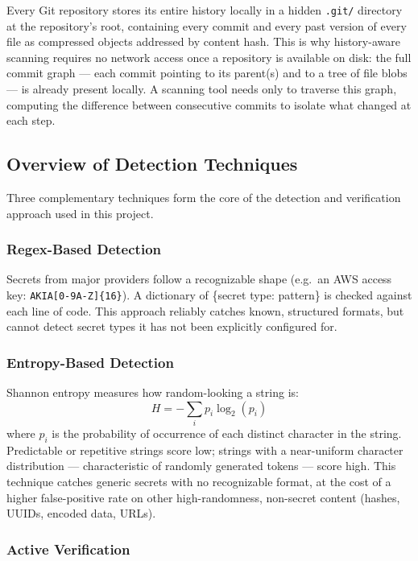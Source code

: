 \documentclass[12pt]{article}
\begin{document}
Every Git repository stores its entire history locally in a hidden \texttt{.git/} directory at the repository's root, containing every commit and every past version of every file as compressed objects addressed by content hash. This is why history-aware scanning requires no network access once a repository is available on disk: the full commit graph --- each commit pointing to its parent(s) and to a tree of file blobs --- is already present locally. A scanning tool needs only to traverse this graph, computing the difference between consecutive commits to isolate what changed at each step.

\subsection{Overview of Detection Techniques}

Three complementary techniques form the core of the detection and verification approach used in this project.

\subsubsection{Regex-Based Detection}

Secrets from major providers follow a recognizable shape (e.g.\ an AWS access key: \texttt{AKIA[0-9A-Z]\{16\}}). A dictionary of \{secret type: pattern\} is checked against each line of code. This approach reliably catches known, structured formats, but cannot detect secret types it has not been explicitly configured for.

\subsubsection{Entropy-Based Detection}

Shannon entropy measures how random-looking a string is:
\[
H = -\sum_{i} p_i \log_2(p_i)
\]
where $p_i$ is the probability of occurrence of each distinct character in the string. Predictable or repetitive strings score low; strings with a near-uniform character distribution --- characteristic of randomly generated tokens --- score high. This technique catches generic secrets with no recognizable format, at the cost of a higher false-positive rate on other high-randomness, non-secret content (hashes, UUIDs, encoded data, URLs).

\subsubsection{Active Verification}
\end{document}

